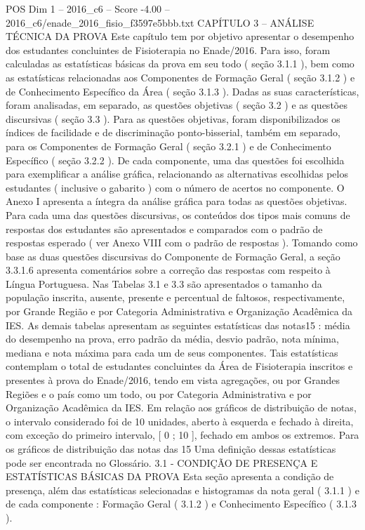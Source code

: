 \begin{textsample}{POS Dim 1 – 2016\_c6 – Score -4.00 – 2016\_c6/enade\_2016\_fisio\_f3597e5bbb.txt}  \label{ex:f1_pos_396}
CAPÍTULO 3 – ANÁLISE TÉCNICA DA PROVA Este capítulo tem por objetivo apresentar o desempenho dos estudantes concluintes de Fisioterapia no Enade/2016.
Para isso, foram calculadas as estatísticas básicas da prova em seu todo ( seção 3.1.1 ), bem como as estatísticas relacionadas aos Componentes de Formação Geral ( seção 3.1.2 ) e de Conhecimento Específico da Área ( seção 3.1.3 ).
Dadas as suas características, foram analisadas, em separado, as questões objetivas ( seção 3.2 ) e as questões discursivas ( seção 3.3 ).
Para as questões objetivas, foram disponibilizados os índices de facilidade e de discriminação ponto-bisserial, também em separado, para os Componentes de Formação Geral ( seção 3.2.1 ) e de Conhecimento Específico ( seção 3.2.2 ).
De cada componente, uma das questões foi escolhida para exemplificar a análise gráfica, relacionando as alternativas escolhidas pelos estudantes ( inclusive o gabarito ) com o número de acertos no componente.
O Anexo I apresenta a íntegra da análise gráfica para todas as questões objetivas.
Para cada uma das questões discursivas, os conteúdos dos tipos mais comuns de respostas dos estudantes são apresentados e comparados com o padrão de respostas esperado ( ver Anexo VIII com o padrão de respostas ).
Tomando como base as duas questões discursivas do Componente de Formação Geral, a seção 3.3.1.6 apresenta comentários sobre a correção das respostas com respeito à Língua Portuguesa.
Nas Tabelas 3.1 e 3.3 são apresentados o tamanho da população inscrita, ausente, presente e percentual de faltosos, respectivamente, por Grande Região e por Categoria Administrativa e Organização Acadêmica da IES.
As demais tabelas apresentam as seguintes estatísticas das notas15 : média do desempenho na prova, erro padrão da média, desvio padrão, nota mínima, mediana e nota máxima para cada um de seus componentes.
Tais estatísticas contemplam o total de estudantes concluintes da Área de Fisioterapia inscritos e presentes à prova do Enade/2016, tendo em vista agregações, ou por Grandes Regiões e o país como um todo, ou por Categoria Administrativa e por Organização Acadêmica da IES.
Em relação aos gráficos de distribuição de notas, o intervalo considerado foi de 10 unidades, aberto à esquerda e fechado à direita, com exceção do primeiro intervalo, [ 0 ; 10 ], fechado em ambos os extremos.
Para os gráficos de distribuição das notas das 15 Uma definição dessas estatísticas pode ser encontrada no Glossário. 3.1 - CONDIÇÃO DE PRESENÇA E ESTATÍSTICAS BÁSICAS DA PROVA Esta seção apresenta a condição de presença, além das estatísticas selecionadas e histogramas da nota geral ( 3.1.1 ) e de cada componente : Formação Geral ( 3.1.2 ) e Conhecimento Específico ( 3.1.3 ).

\end{textsample}
